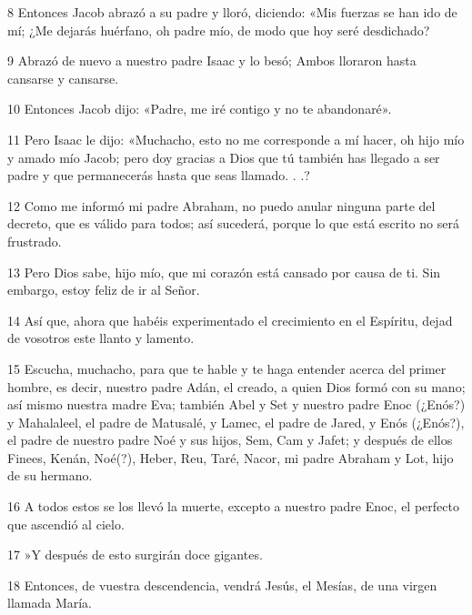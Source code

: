 \par 8 Entonces Jacob abrazó a su padre y lloró, diciendo: «Mis fuerzas se han ido de mí; ¿Me dejarás huérfano, oh padre mío, de modo que hoy seré desdichado?

\par 9 Abrazó de nuevo a nuestro padre Isaac y lo besó; Ambos lloraron hasta cansarse y cansarse.

\par 10 Entonces Jacob dijo: «Padre, me iré contigo y no te abandonaré».

\par 11 Pero Isaac le dijo: «Muchacho, esto no me corresponde a mí hacer, oh hijo mío y amado mío Jacob; pero doy gracias a Dios que tú también has llegado a ser padre y que permanecerás hasta que seas llamado. . .?

\par 12 Como me informó mi padre Abraham, no puedo anular ninguna parte del decreto, que es válido para todos; así sucederá, porque lo que está escrito no será frustrado.

\par 13 Pero Dios sabe, hijo mío, que mi corazón está cansado por causa de ti. Sin embargo, estoy feliz de ir al Señor.

\par 14 Así que, ahora que habéis experimentado el crecimiento en el Espíritu, dejad de vosotros este llanto y lamento.

\par 15 Escucha, muchacho, para que te hable y te haga entender acerca del primer hombre, es decir, nuestro padre Adán, el creado, a quien Dios formó con su mano; así mismo nuestra madre Eva; también Abel y Set y nuestro padre Enoc (¿Enós?) y Mahalaleel, el padre de Matusalé, y Lamec, el padre de Jared, y Enós (¿Enós?), el padre de nuestro padre Noé y sus hijos, Sem, Cam y Jafet; y después de ellos Finees, Kenán, Noé(?), Heber, Reu, Taré, Nacor, mi padre Abraham y Lot, hijo de su hermano.

\par 16 A todos estos se los llevó la muerte, excepto a nuestro padre Enoc, el perfecto que ascendió al cielo.

\par 17 »Y después de esto surgirán doce gigantes.

\par 18 Entonces, de vuestra descendencia, vendrá Jesús, el Mesías, de una virgen llamada María.

